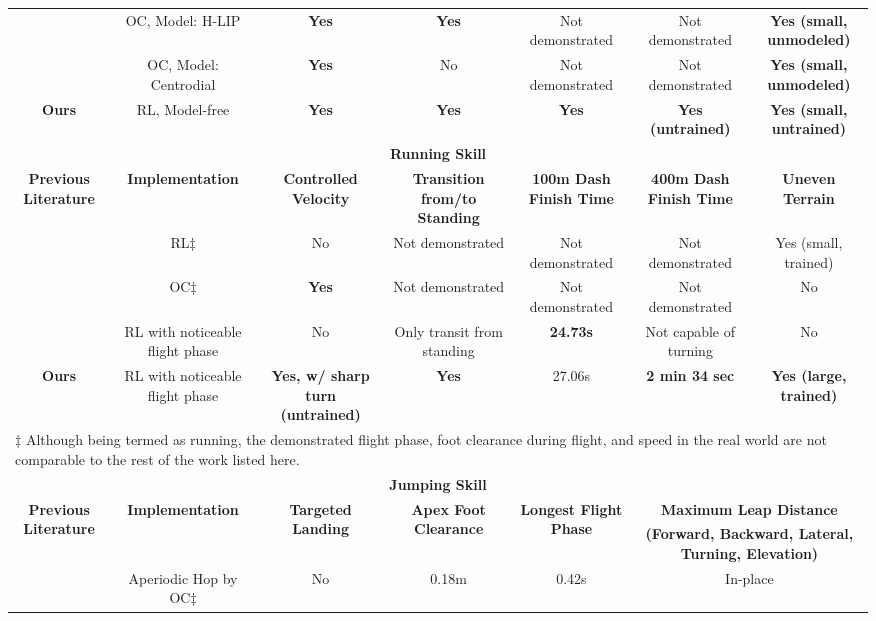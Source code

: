 \begin{table}[]
\begin{tabular}{ccccccc}
\cite{xiong20223} & OC, Model: H-LIP & \textbf{Yes} & \textbf{Yes} & Not demonstrated & Not demonstrated & \textbf{Yes (small, unmodeled)} \\
\cite{agrawal2022model} & OC, Model: Centrodial & \textbf{Yes} & No & Not demonstrated & Not demonstrated & \textbf{Yes (small, unmodeled)} \\
\textbf{Ours} & RL, Model-free & \textbf{Yes} & \textbf{Yes} & \textbf{Yes} & \textbf{Yes (untrained)} & \textbf{Yes (small, untrained)} \\ \hline
\multicolumn{7}{c}{\scriptsize{\textbf{Running Skill}}} \\ \hline
\textbf{Previous Literature} & \textbf{Implementation} & \textbf{Controlled Velocity} & \textbf{Transition from/to Standing} & \textbf{100m Dash Finish Time} & \textbf{400m Dash Finish Time} & \textbf{Uneven Terrain} \\ \hline
\cite{siekmann2021sim} & RL$\ddagger$ & No & Not demonstrated & Not demonstrated & Not demonstrated & Yes (small, trained) \\
\cite{yang2023impact} & OC$\ddagger$ & \textbf{Yes} & Not demonstrated & Not demonstrated & Not demonstrated & No \\
\cite{crowley2023optimizing} & RL with noticeable flight phase & No & Only transit from standing & \textbf{24.73s} & Not capable of turning & No \\
\textbf{Ours} & RL with noticeable flight phase & \textbf{Yes, w/ sharp turn (untrained)} & \textbf{Yes} & 27.06s & \textbf{2 min 34 sec} & \textbf{Yes (large, trained)} \\
\multicolumn{7}{l}{$\ddagger$ Although being termed as running, the demonstrated flight phase, foot clearance during flight, and speed in the real world are not comparable to the rest of the work listed here.}   \\ \hline
\multicolumn{7}{c}{\scriptsize{\textbf{Jumping Skill}}} \\ \hline
\multirow{2}{*}{\textbf{Previous Literature}} & \multirow{2}{*}{\textbf{Implementation}} & \multirow{2}{*}{\textbf{Targeted Landing}} & \multirow{2}{*}{\textbf{Apex Foot Clearance}} & \multirow{2}{*}{\textbf{Longest Flight Phase}} & \multicolumn{2}{c}{\textbf{Maximum Leap Distance}} \\ \cline{6-7} 
 &  &  &  &  & \multicolumn{2}{c}{\textbf{(Forward, Backward, Lateral, Turning, Elevation)}} \\ \hline
\cite{xiong2018bipedal} & Aperiodic Hop by OC$\ddagger$ & No & 0.18m & 0.42s & \multicolumn{2}{c}{In-place} \\ %

\end{tabular}
\end{table}
